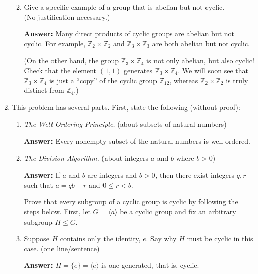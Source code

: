 \documentclass[12pt]{article}
\newcommand{\<}{\ensuremath{\langle}}
\renewcommand{\>}{\ensuremath{\rangle}}
\newcommand{\Z}{\ensuremath{\mathbb{Z}}}
\begin{document}
\begin{enumerate}[{\bf 1.}]
\begin{enumerate}
    \vskip1cm
  
  \item Give a specific example of a group that is abelian but not cyclic.\\
    (No justification necessary.)

    \medskip

    {\bf Answer:} Many direct products of cyclic groups are abelian but not
    cyclic.  For example, $\Z_2 \times \Z_2$ and $\Z_3 \times \Z_3$ are both
    abelian but not cyclic. 

    (On the other hand, the group $\Z_3 \times \Z_4$ is
    not only abelian, but also cyclic! Check that the element $(1,1)$ generates
    $\Z_3 \times \Z_4$. We will soon see that $\Z_3 \times \Z_4$ is
    just a ``copy'' of the cyclic group $\Z_{12}$, whereas $\Z_2 \times \Z_2$ is truly
    distinct from $\Z_4$.)
  \end{enumerate}

  \newpage
\item This problem has several parts.
  First, state the following (without proof):
  \begin{enumerate}
  \item \emph{The Well Ordering Principle.} (about subsets of natural numbers)

    \medskip

    {\bf Answer:} Every nonempty subset of the natural numbers is well ordered.

\vskip1cm

  \item \emph{The Division Algorithm.} (about integers $a$ and $b$ where $b>0$)

    \medskip

    {\bf Answer:} If $a$ and $b$ are integers and $b>0$, then there exist integers
    $q, r$ such that $a = qb+r$ and $0\leq r < b$. 


    \vskip1cm

    Prove that every subgroup of a cyclic group is cyclic by following the steps below.
    First, let $G = \<a\>$ be a cyclic group and fix an arbitrary subgroup $H\leq G$.

    \medskip

  \item Suppose $H$ contains only the identity, $e$. Say why $H$
    must be cyclic in this case. (one line/sentence)

    \medskip

    {\bf Answer:} $H = \{e\} = \<e\>$ is one-generated, that is, cyclic.


\end{enumerate}
\end{enumerate}
\end{document}
